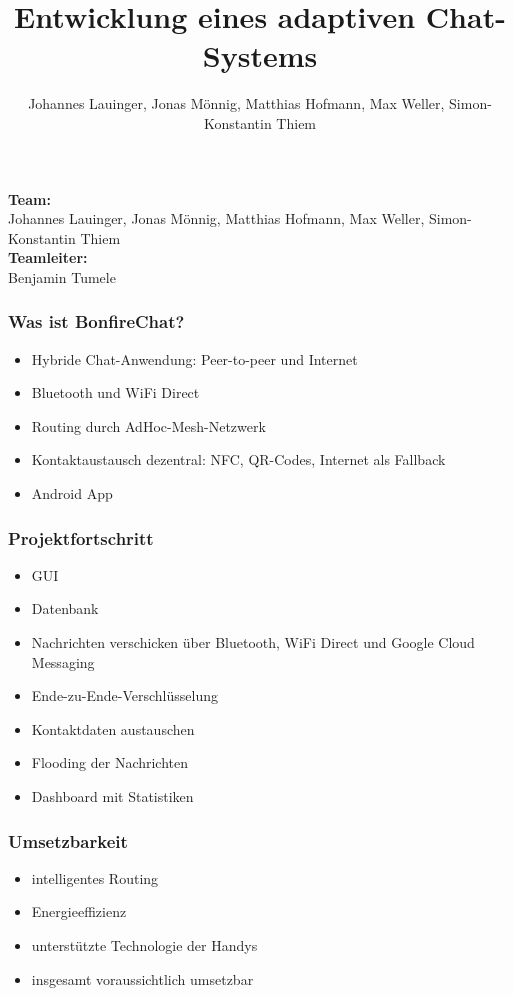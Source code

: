 \documentclass[accentcolor=tud4c,colorbacktitle]{tudbeamer}
\title{Entwicklung eines adaptiven Chat-Systems}
\author{Johannes Lauinger, Jonas Mönnig, Matthias Hofmann, Max Weller, Simon-Konstantin Thiem}
\begin{document}
  \begin{titleframe}
    \textbf{Team:}\\
    Johannes Lauinger, Jonas Mönnig, Matthias Hofmann, Max Weller, Simon-Konstantin Thiem\\
    \vspace{0.5cm}
    \textbf{Teamleiter:}\\
    Benjamin Tumele
  \end{titleframe}

  \begin{frame}
    \frametitle{Was ist BonfireChat?}
    \begin{itemize}
      \item Hybride Chat-Anwendung: Peer-to-peer und Internet
      \item Bluetooth und WiFi Direct
      \item Routing durch AdHoc-Mesh-Netzwerk
      \item Kontaktaustausch dezentral: NFC, QR-Codes, Internet als Fallback
      \item Android App
    \end{itemize}
  \end{frame}

  \begin{frame}
    \frametitle{Projektfortschritt}
    \begin{itemize}
      \item GUI
      \item Datenbank
      \item Nachrichten verschicken über Bluetooth, WiFi Direct und Google Cloud Messaging
      \item Ende-zu-Ende-Verschlüsselung
      \item Kontaktdaten austauschen
      \item Flooding der Nachrichten
      \item Dashboard mit Statistiken
    \end{itemize}
  \end{frame}

  \begin{frame}
    \frametitle{Umsetzbarkeit}
    \begin{itemize}
      \item intelligentes Routing
      \item Energieeffizienz
      \item unterstützte Technologie der Handys
    \end{itemize}
    \begin{itemize}
      \item insgesamt voraussichtlich umsetzbar
    \end{itemize}
  \end{frame}
\end{document}
